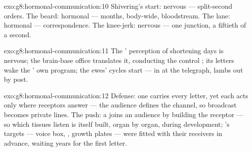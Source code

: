 \begin{solution}{exo:g8:hormonal-communication:10}
Shivering's start: nervous --- split-second 
orders. The beard: hormonal --- months, body-wide,
bloodstream. The  lane: hormonal --- 
correspondence. The knee-jerk: nervous --- one junction,
a fiftieth of a second.
\end{solution}

\begin{solution}{exo:g8:hormonal-communication:11}
The ' perception of shortening days is nervous; the
brain-base office translates it, conducting the control
; its letters wake the ' own 
program; the ewes' cycles start ---  in at the
telegraph, lambs out by post.
\end{solution}

\begin{solution}{exo:g8:hormonal-communication:12}
Defense: one  carries every letter, yet each acts
only where receptors answer --- the audience defines the
channel, so broadcast becomes private lines. The push: a
 joins an audience by building the receptor --- so
which tissues listen is itself built, organ by organ,
during development; 's targets --- voice box,
, growth plates --- were fitted with their receivers
in advance, waiting years for the first letter.
\end{solution}

